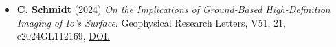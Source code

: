 \documentclass[12pt]{report}
\begin{document}
\begin{itemize}
  \item \textbf{C. Schmidt} (2024) \textit{On the Implications of Ground-Based High-Definition Imaging of Io's Surface}. Geophysical Research Letters, V51, 21, e2024GL112169, \href{https://doi.org/10.1029/2024GL112169}{DOI.}   

\end{itemize}
\end{document}
